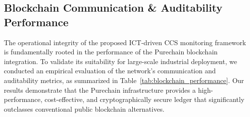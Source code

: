 \documentclass[conference]{IEEEtran}
\begin{document}
{%


\subsection{Blockchain Communication \& Auditability Performance}
The operational integrity of the proposed ICT-driven CCS monitoring framework is fundamentally rooted in the performance of the Purechain blockchain integration. To validate its suitability for large-scale industrial deployment, we conducted an empirical evaluation of the network's communication and auditability metrics, as summarized in Table~\ref{tab:blockchain_performance}. Our results demonstrate that the Purechain infrastructure provides a high-performance, cost-effective, and cryptographically secure ledger that significantly outclasses conventional public blockchain alternatives.


}
\end{document}
